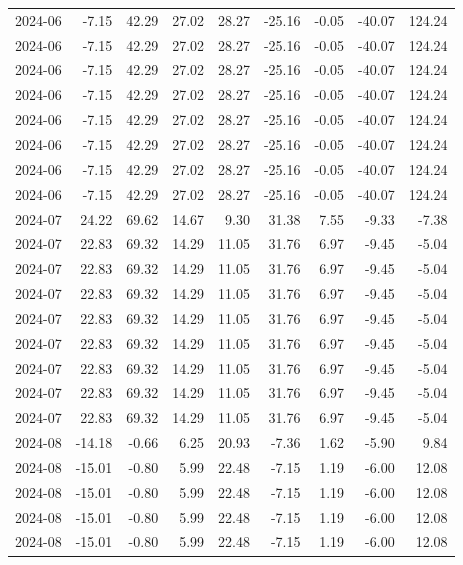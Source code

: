 \begin{table}[ht]
\begin{tabular}{lrrrrrrrr}
  2024-06 & -7.15 & 42.29 & 27.02 & 28.27 & -25.16 & -0.05 & -40.07 & 124.24 \\ 
  2024-06 & -7.15 & 42.29 & 27.02 & 28.27 & -25.16 & -0.05 & -40.07 & 124.24 \\ 
  2024-06 & -7.15 & 42.29 & 27.02 & 28.27 & -25.16 & -0.05 & -40.07 & 124.24 \\ 
  2024-06 & -7.15 & 42.29 & 27.02 & 28.27 & -25.16 & -0.05 & -40.07 & 124.24 \\ 
  2024-06 & -7.15 & 42.29 & 27.02 & 28.27 & -25.16 & -0.05 & -40.07 & 124.24 \\ 
  2024-06 & -7.15 & 42.29 & 27.02 & 28.27 & -25.16 & -0.05 & -40.07 & 124.24 \\ 
  2024-06 & -7.15 & 42.29 & 27.02 & 28.27 & -25.16 & -0.05 & -40.07 & 124.24 \\ 
  2024-06 & -7.15 & 42.29 & 27.02 & 28.27 & -25.16 & -0.05 & -40.07 & 124.24 \\ 
  2024-07 & 24.22 & 69.62 & 14.67 & 9.30 & 31.38 & 7.55 & -9.33 & -7.38 \\ 
  2024-07 & 22.83 & 69.32 & 14.29 & 11.05 & 31.76 & 6.97 & -9.45 & -5.04 \\ 
  2024-07 & 22.83 & 69.32 & 14.29 & 11.05 & 31.76 & 6.97 & -9.45 & -5.04 \\ 
  2024-07 & 22.83 & 69.32 & 14.29 & 11.05 & 31.76 & 6.97 & -9.45 & -5.04 \\ 
  2024-07 & 22.83 & 69.32 & 14.29 & 11.05 & 31.76 & 6.97 & -9.45 & -5.04 \\ 
  2024-07 & 22.83 & 69.32 & 14.29 & 11.05 & 31.76 & 6.97 & -9.45 & -5.04 \\ 
  2024-07 & 22.83 & 69.32 & 14.29 & 11.05 & 31.76 & 6.97 & -9.45 & -5.04 \\ 
  2024-07 & 22.83 & 69.32 & 14.29 & 11.05 & 31.76 & 6.97 & -9.45 & -5.04 \\ 
  2024-07 & 22.83 & 69.32 & 14.29 & 11.05 & 31.76 & 6.97 & -9.45 & -5.04 \\ 
  2024-08 & -14.18 & -0.66 & 6.25 & 20.93 & -7.36 & 1.62 & -5.90 & 9.84 \\ 
  2024-08 & -15.01 & -0.80 & 5.99 & 22.48 & -7.15 & 1.19 & -6.00 & 12.08 \\ 
  2024-08 & -15.01 & -0.80 & 5.99 & 22.48 & -7.15 & 1.19 & -6.00 & 12.08 \\ 
  2024-08 & -15.01 & -0.80 & 5.99 & 22.48 & -7.15 & 1.19 & -6.00 & 12.08 \\ 
  2024-08 & -15.01 & -0.80 & 5.99 & 22.48 & -7.15 & 1.19 & -6.00 & 12.08 \\ 

\end{tabular}
\end{table}
